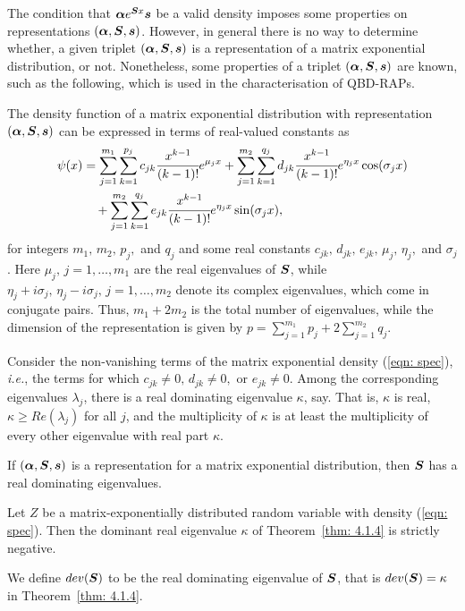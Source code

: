 The condition that \(\boldsymbol \alpha e^{\boldsymbol Sx}\boldsymbol s\) be a valid density imposes some properties on representations \((\boldsymbol \alpha, \boldsymbol S, \boldsymbol s)\). However, in general there is no way to determine whether, a given triplet \((\boldsymbol \alpha, \boldsymbol S, \boldsymbol s)\) is a representation of a matrix exponential distribution, or not. Nonetheless, some properties of a triplet \((\boldsymbol \alpha, \boldsymbol S, \boldsymbol s)\) are known, such as the following, which is used in the characterisation of QBD-RAPs. 
\begin{thm}
	The density function of a matrix exponential distribution with representation \((\boldsymbol\alpha, \boldsymbol S, \boldsymbol s)\) can be expressed in terms of real-valued constants as 
	\begin{align}
		\psi(x)&=\sum_{j=1}^{m_1} \sum_{k=1}^{p_j} c_{jk} \cfrac{x^{k-1}}{(k-1)!} e^{\mu_jx} + \sum_{j=1}^{m_2}\sum_{k=1}^{q_j} d_{jk}\cfrac{x^{k-1}}{(k-1)!}e^{\eta_jx}\cos(\sigma_jx) \nonumber 
		\\&\quad{}+ \sum_{j=1}^{m_2}\sum_{k=1}^{q_j}e_{jk}\cfrac{x^{k-1}}{(k-1)!}e^{\eta_jx}\sin(\sigma_jx), \label{eqn: spec}
	\end{align}
	for integers \(m_1,\,m_2,\,p_j,\) and \(q_j\) and some real constants \(c_{jk},\,d_{jk},\,e_{jk},\,\mu_j,\,\eta_j,\) and \(\sigma_j\). Here \(\mu_j,\, j=1,\dots,m_1\) are the real eigenvalues of \(\boldsymbol S\), while \(\eta_j+i\sigma_j, \, \eta_j-i\sigma_j,\, j=1,\dots,m_2\) denote its complex eigenvalues, which come in conjugate pairs. Thus, \(m_1+2m_2\) is the total number of eigenvalues, while the dimension of the representation is given by \(\displaystyle p=\sum_{j=1}^{m_1}p_j + 2\sum_{j=1}^{m_2}q_j\). 
\end{thm}
\begin{thm}\label{thm: 4.1.4}
	Consider the non-vanishing terms of the matrix exponential density (\ref{eqn: spec}), \emph{i.e.}, the terms for which \(c_{jk}\neq 0,\,d_{jk}\neq 0,\) or \(e_{jk}\neq 0\). Among the corresponding eigenvalues \(\lambda_j\), there is a real dominating eigenvalue \(\kappa\), say. That is, \(\kappa\) is real, \(\kappa \geq Re(\lambda_j)\) for all \(j\), and the multiplicity of \(\kappa\) is at least the multiplicity of every other eigenvalue with real part \(\kappa\).
\end{thm}
\begin{cor}
If \((\boldsymbol \alpha, \boldsymbol S, \boldsymbol s)\) is a representation for a matrix exponential distribution, then \(\boldsymbol S\) has a real dominating eigenvalues.
\end{cor}
\begin{thm}
	Let \(Z\) be a matrix-exponentially distributed random variable with density (\ref{eqn: spec}). Then the dominant real eigenvalue \(\kappa\) of Theorem~\ref{thm: 4.1.4} is strictly negative. 
\end{thm}
We define \(dev(\boldsymbol S)\) to be the real dominating eigenvalue of \(\boldsymbol S\), that is \(dev(\boldsymbol S)=\kappa\) in Theorem~\ref{thm: 4.1.4}.

